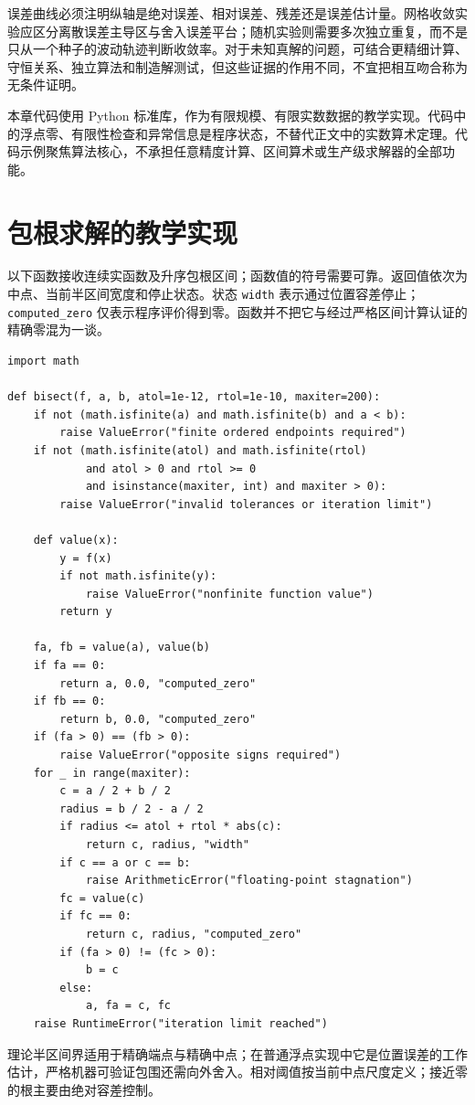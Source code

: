 \documentclass[UTF8,12pt,a4paper,fontset=fandol]{ctexbook}
\begin{document}
误差曲线必须注明纵轴是绝对误差、相对误差、残差还是误差估计量。网格收敛实验应区分离散误差主导区与舍入误差平台；随机实验则需要多次独立重复，而不是只从一个种子的波动轨迹判断收敛率。对于未知真解的问题，可结合更精细计算、守恒关系、独立算法和制造解测试，但这些证据的作用不同，不宜把相互吻合称为无条件证明。

本章代码使用 Python 标准库，作为有限规模、有限实数数据的教学实现。代码中的浮点零、有限性检查和异常信息是程序状态，不替代正文中的实数算术定理。代码示例聚焦算法核心，不承担任意精度计算、区间算术或生产级求解器的全部功能。

\section{包根求解的教学实现}
以下函数接收连续实函数及升序包根区间；函数值的符号需要可靠。返回值依次为中点、当前半区间宽度和停止状态。状态 \texttt{width} 表示通过位置容差停止；\texttt{computed\_zero} 仅表示程序评价得到零。函数并不把它与经过严格区间计算认证的精确零混为一谈。
\begin{verbatim}
import math

def bisect(f, a, b, atol=1e-12, rtol=1e-10, maxiter=200):
    if not (math.isfinite(a) and math.isfinite(b) and a < b):
        raise ValueError("finite ordered endpoints required")
    if not (math.isfinite(atol) and math.isfinite(rtol)
            and atol > 0 and rtol >= 0
            and isinstance(maxiter, int) and maxiter > 0):
        raise ValueError("invalid tolerances or iteration limit")

    def value(x):
        y = f(x)
        if not math.isfinite(y):
            raise ValueError("nonfinite function value")
        return y

    fa, fb = value(a), value(b)
    if fa == 0:
        return a, 0.0, "computed_zero"
    if fb == 0:
        return b, 0.0, "computed_zero"
    if (fa > 0) == (fb > 0):
        raise ValueError("opposite signs required")
    for _ in range(maxiter):
        c = a / 2 + b / 2
        radius = b / 2 - a / 2
        if radius <= atol + rtol * abs(c):
            return c, radius, "width"
        if c == a or c == b:
            raise ArithmeticError("floating-point stagnation")
        fc = value(c)
        if fc == 0:
            return c, radius, "computed_zero"
        if (fa > 0) != (fc > 0):
            b = c
        else:
            a, fa = c, fc
    raise RuntimeError("iteration limit reached")
\end{verbatim}
理论半区间界适用于精确端点与精确中点；在普通浮点实现中它是位置误差的工作估计，严格机器可验证包围还需向外舍入。相对阈值按当前中点尺度定义；接近零的根主要由绝对容差控制。
\end{document}
